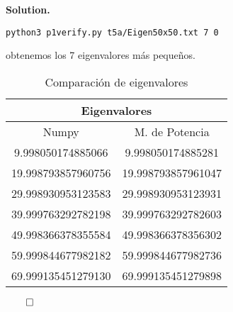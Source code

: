 \documentclass{article}
\theoremstyle{problemstyle}
\newenvironment{solution}{%
  \begin{mdframed}[linewidth=0.8pt,linecolor=Gray,backgroundcolor=Gray!5,roundcorner=5pt]%
  \noindent\textbf{Solution.}%
}{%
\hfill $ \qed $ 
  \end{mdframed}%
}
\begin{document}
\begin{solution}
\begin{enumerate}
\begin{center}
		      \end{center}
		      \begin{center}
			      \texttt{python3 p1\textunderscore verify.py t5a/Eigen\textunderscore50x50.txt 7 0}
		      \end{center}
		      obtenemos los 7 eigenvalores m\'as peque\~nos.
		      \begin{table}[H]
			      \begin{center}
				      \begin{tabular}{|c|c|}
					      \multicolumn{2}{c}{Eigenvalores}        \\
					      \hline
					      Numpy              & M. de Potencia     \\
					      \hline

					      9.998050174885066  & 9.998050174885281  \\
					      \hline
					      19.998793857960756 & 19.998793857961047 \\
					      \hline
					      29.998930953123583 & 29.998930953123931 \\
					      \hline
					      39.999763292782198 & 39.999763292782603 \\
					      \hline
					      49.998366378355584 & 49.998366378356302 \\
					      \hline
					      59.999844677982182 & 59.999844677982736 \\
					      \hline
					      69.999135451279130 & 69.999135451279898 \\
					      \hline
				      \end{tabular}
			      \end{center}
			      \caption{Comparaci\'on de eigenvalores}\label{tab:invevals_comparison50x50}
		      \end{table}


\end{enumerate}
\end{solution}
\end{document}
